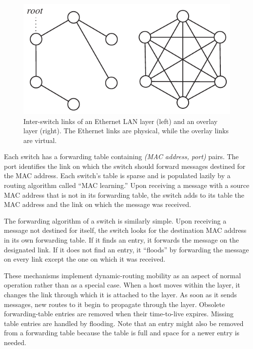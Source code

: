 \begin{figure}
\centering
\includegraphics[scale=1.00]{figures/ethlinks.pdf}
\caption{Inter-switch links of an Ethernet LAN layer (left) and an overlay
layer (right).
The Ethernet links are physical, while the overlay links are virtual.}
\label{fig:ethlinks}
\end{figure}

Each switch has a forwarding table containing {\it (MAC address, port)}
pairs.
The port identifies the link on which the switch should forward messages
destined for the MAC address.  
Each switch's table is sparse and is populated lazily by a routing
algorithm called ``MAC learning.''
Upon receiving a message with a source MAC 
address that is not in its forwarding
table, the switch adds to its table the MAC address and the link
on which the message was received.

The forwarding algorithm of a switch is similarly simple.
Upon receiving a message not destined for itself, the switch looks for the
destination MAC address in its own forwarding table.
If it finds an entry, it forwards the message on the designated link.
If it does not find an entry, it ``floods'' by forwarding the message
on every link except the one on which it was received.

These mechanisms implement dynamic-routing mobility as an
aspect of normal operation rather than as a special case.
When a host moves within the layer, it changes the link through which
it is attached to the layer.
As soon as it sends messages, new routes to it begin to propagate through
the layer.
Obsolete forwarding-table entries
are removed when their time-to-live expires.
Missing table entries are handled by flooding.
Note that an entry might also be removed from a forwarding table because
the table is full and space for a newer entry is needed.

